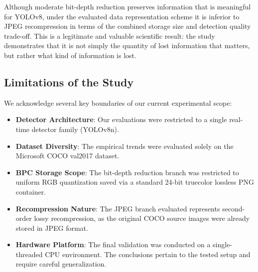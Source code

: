 \documentclass[12pt, a4paper]{article}
\begin{document}
Although moderate bit-depth reduction preserves information that is meaningful for YOLOv8, under the evaluated data representation scheme it is inferior to JPEG recompression in terms of the combined storage size and detection quality trade-off. This is a legitimate and valuable scientific result: the study demonstrates that it is not simply the quantity of lost information that matters, but rather what kind of information is lost.

\subsection{Limitations of the Study}
We acknowledge several key boundaries of our current experimental scope:
\begin{itemize}
    \item \textbf{Detector Architecture}: Our evaluations were restricted to a single real-time detector family (YOLOv8n).
    \item \textbf{Dataset Diversity}: The empirical trends were evaluated solely on the Microsoft COCO val2017 dataset.
    \item \textbf{BPC Storage Scope}: The bit-depth reduction branch was restricted to uniform RGB quantization saved via a standard 24-bit truecolor lossless PNG container.
    \item \textbf{Recompression Nature}: The JPEG branch evaluated represents second-order lossy recompression, as the original COCO source images were already stored in JPEG format.
    \item \textbf{Hardware Platform}: The final validation was conducted on a single-threaded CPU environment. The conclusions pertain to the tested setup and require careful generalization.
\end{itemize}
\end{document}
